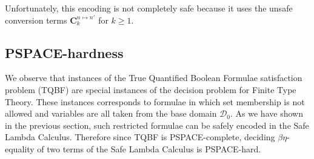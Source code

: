 Unfortunately, this encoding is not completely safe because it uses
the unsafe conversion terms $\mathbf{C}_k^{n\mapsto n'}$ for
$k\geq1$.



\subsection{PSPACE-hardness}
We observe that instances of the True Quantified Boolean Formulae satisfaction problem (TQBF) are special instances of the decision problem for Finite Type Theory. These instances corresponds to formulae in which set membership is not allowed and variables are all taken from the base domain $\mathcal{D}_0$.
As we have shown in the previous section, such restricted formulae can be safely encoded in the Safe Lambda Calculus. Therefore since TQBF is PSPACE-complete, deciding $\beta\eta$-equality of two terms of the Safe Lambda Calculus is PSPACE-hard.

